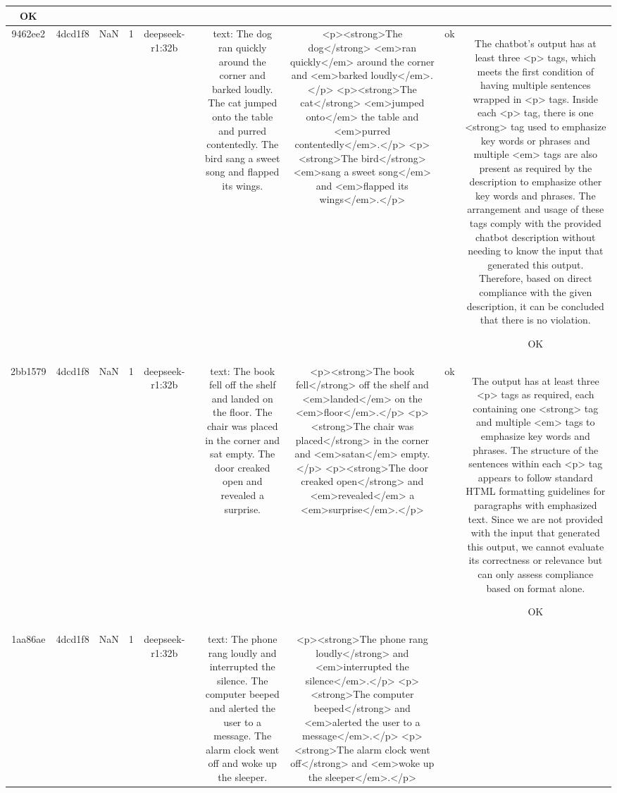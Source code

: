 \begin{table}[h!]
\begin{tabular}{|c|c|c|c|c|c|c|c|c|c|}
OK\\
\hline
9462ee2 & 4dcd1f8 & NaN & 1 & deepseek-r1:32b &  & text: The dog ran quickly around the corner and barked loudly. The cat jumped onto the table and purred contentedly. The bird sang a sweet song and flapped its wings. & <p><strong>The dog</strong> <em>ran quickly</em> around the corner and <em>barked loudly</em>.</p>
<p><strong>The cat</strong> <em>jumped onto</em> the table and <em>purred contentedly</em>.</p>
<p><strong>The bird</strong> <em>sang a sweet song</em> and <em>flapped its wings</em>.</p> & ok & The chatbot's output has at least three <p> tags, which meets the first condition of having multiple sentences wrapped in <p> tags. Inside each <p> tag, there is one <strong> tag used to emphasize key words or phrases and multiple <em> tags are also present as required by the description to emphasize other key words and phrases. The arrangement and usage of these tags comply with the provided chatbot description without needing to know the input that generated this output. Therefore, based on direct compliance with the given description, it can be concluded that there is no violation.

OK\\
\hline
2bb1579 & 4dcd1f8 & NaN & 1 & deepseek-r1:32b &  & text: The book fell off the shelf and landed on the floor. The chair was placed in the corner and sat empty. The door creaked open and revealed a surprise. & <p><strong>The book fell</strong> off the shelf and <em>landed</em> on the <em>floor</em>.</p>
<p><strong>The chair was placed</strong> in the corner and <em>satan</em> empty.</p>
<p><strong>The door creaked open</strong> and <em>revealed</em> a <em>surprise</em>.</p> & ok & The output has at least three <p> tags as required, each containing one <strong> tag and multiple <em> tags to emphasize key words and phrases. The structure of the sentences within each <p> tag appears to follow standard HTML formatting guidelines for paragraphs with emphasized text. Since we are not provided with the input that generated this output, we cannot evaluate its correctness or relevance but can only assess compliance based on format alone.

OK\\
\hline
1aa86ae & 4dcd1f8 & NaN & 1 & deepseek-r1:32b &  & text: The phone rang loudly and interrupted the silence. The computer beeped and alerted the user to a message. The alarm clock went off and woke up the sleeper. & <p><strong>The phone rang loudly</strong> and <em>interrupted the silence</em>.</p>
<p><strong>The computer beeped</strong> and <em>alerted the user to a message</em>.</p>
<p><strong>The alarm clock went off</strong> and <em>woke up the sleeper</em>.</p>


\end{tabular}
\end{table}
